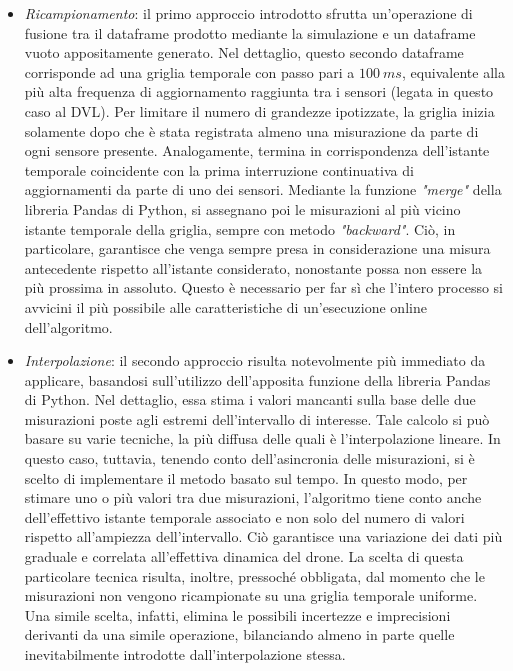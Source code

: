 \begin{itemize}
\begin{itemize}
            \item \textit{Ricampionamento}: il primo approccio introdotto sfrutta un'operazione di fusione tra il dataframe prodotto mediante la simulazione e un dataframe vuoto appositamente generato. Nel dettaglio, questo secondo dataframe corrisponde ad una griglia temporale con passo pari a $100 \ ms$, equivalente alla più alta frequenza di aggiornamento raggiunta tra i sensori (legata in questo caso al DVL). Per limitare il numero di grandezze ipotizzate, la griglia inizia solamente dopo che è stata registrata almeno una misurazione da parte di ogni sensore presente. Analogamente, termina in corrispondenza dell'istante temporale coincidente con la prima interruzione continuativa di aggiornamenti da parte di uno dei sensori. Mediante la funzione \emph{"merge"} della libreria Pandas di Python, si assegnano poi le misurazioni al più vicino istante temporale della griglia, sempre con metodo \emph{"backward"}. Ciò, in particolare, garantisce che venga sempre presa in considerazione una misura antecedente rispetto all'istante considerato, nonostante possa non essere la più prossima in assoluto. Questo è necessario per far sì che l'intero processo si avvicini il più possibile alle caratteristiche di un'esecuzione online dell'algoritmo.       
            
            \item \textit{Interpolazione}: il secondo approccio risulta notevolmente più immediato da applicare, basandosi sull'utilizzo dell'apposita funzione della libreria Pandas di Python. Nel dettaglio, essa stima i valori mancanti sulla base delle due misurazioni poste agli estremi dell'intervallo di interesse. Tale calcolo si può basare su varie tecniche, la più diffusa delle quali è l'interpolazione lineare. In questo caso, tuttavia, tenendo conto dell'asincronia delle misurazioni, si è scelto di implementare il metodo basato sul tempo. In questo modo, per stimare uno o più valori tra due misurazioni, l'algoritmo tiene conto anche dell'effettivo istante temporale associato e non solo del numero di valori rispetto all'ampiezza dell'intervallo. Ciò garantisce una variazione dei dati più graduale e correlata all'effettiva dinamica del drone. La scelta di questa particolare tecnica risulta, inoltre, pressoché obbligata, dal momento che le misurazioni non vengono ricampionate su una griglia temporale uniforme. Una simile scelta, infatti, elimina le possibili incertezze e imprecisioni derivanti da una simile operazione, bilanciando almeno in parte quelle inevitabilmente introdotte dall'interpolazione stessa.    
        

\end{itemize}
\end{itemize}
